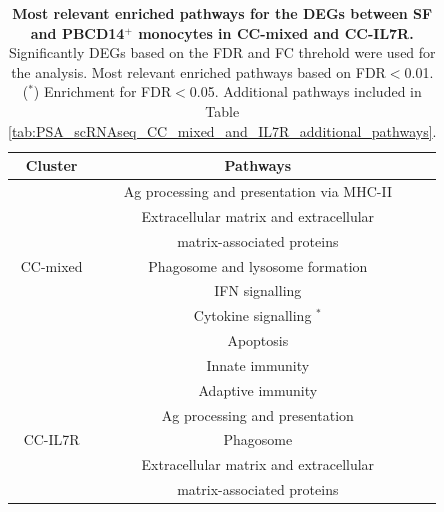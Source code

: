 \begin{table}[htbp]
\centering
\begin{tabular}{@{} c c c}
\toprule
\textbf{Cluster} & \textbf{Pathways} \\
\midrule
\midrule
         & Ag processing and presentation via MHC-II \\
				 & Extracellular matrix and extracellular \\
				 & matrix-associated proteins \\
CC-mixed & Phagosome and lysosome formation \\
				 & IFN signalling \\
				 & Cytokine signalling $^\ast$ \\
				 & Apoptosis \\
				 & Innate immunity \\
\midrule				
         & Adaptive immunity \\
         & Ag processing and presentation \\
CC-IL7R	 & Phagosome \\
         & Extracellular matrix and extracellular \\
				 & matrix-associated proteins \\
\bottomrule
\end{tabular}
\medskip %
\caption[Most relevant enriched pathways for the DEGs between SF and PBCD14$^+$ monocytes in CC-mixed and CC-IL7R.]{\textbf{Most relevant enriched pathways for the DEGs between SF and PBCD14$^+$ monocytes in CC-mixed and CC-IL7R.} Significantly DEGs based on the FDR and FC threhold were used for the analysis. Most relevant enriched pathways based on FDR$<$0.01. ($^\ast$) Enrichment for FDR$<$0.05. Additional pathways included in Table \ref{tab:PSA_scRNAseq_CC_mixed_and_IL7R_additional_pathways}.}
\label{tab:PSA_scRNAseq_CD14_DEGs_pathway_analysis}
\end{table}


